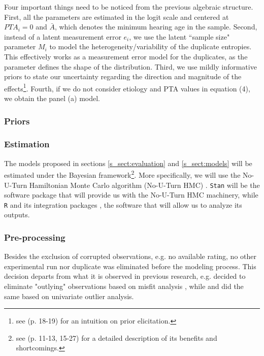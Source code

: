 Four important things need to be noticed from the previous algebraic structure. First, all the parameters are estimated in the logit scale and centered at $PTA_{i}=0$ and $\bar{A}$, which denotes the minimum hearing age in the sample. Second, instead of a latent measurement error $e_i$, we use the latent ``sample size" parameter $M_{i}$ to model the heterogeneity/variability of the duplicate entropies. This effectively works as a measurement error model for the duplicates, as the parameter defines the shape of the distribution. Third, we use mildly informative priors to state our uncertainty regarding the direction and magnitude of the effects\footnote{see \citet{Rivera_2021} (p. 18-19) for an intuition on prior elicitation.}. Fourth, if we do not consider etiology and PTA values in equation (4), we obtain the panel (a) model.
%
%

\subsubsection{Priors}

\subsubsection{Estimation}
The models proposed in sections \ref{s_sect:evaluation} and \ref{s_sect:models} will be estimated under the Bayesian framework\footnote{see \citet{Rivera_2021} (p. 11-13, 15-27) for a detailed description of its benefits and shortcomings.}. More specifically, we will use the No-U-Turn Hamiltonian Monte Carlo algorithm (No-U-Turn HMC) \citep{Betancourt_et_al_2013, Duane_et_al_1987, Hoffman_et_al_2014, Neal_2012}. \texttt{Stan} \citep{Stan_2020} will be the software package that will provide us with the No-U-Turn HMC machinery, while \texttt{R} \citep{R_2015} and its integration packages \citep{RStan_2020}, the software that will allow us to analyze its outputs.


\subsubsection{Pre-processing} \label{ss_sect:preproc}
%
Besides the exclusion of corrupted observations, e.g. no available rating, no other experimental run nor duplicate was eliminated before the modeling process. This decision departs from what it is observed in previous research, e.g. \citet{Boonen_et_al_2020} decided to eliminate "outlying" observations based on misfit analysis \citep{Lesterhuis_2018}, while \citet{vanDaal_2020} and \citet{Boonen_et_al_2021} did the same based on univariate outlier analysis. 

